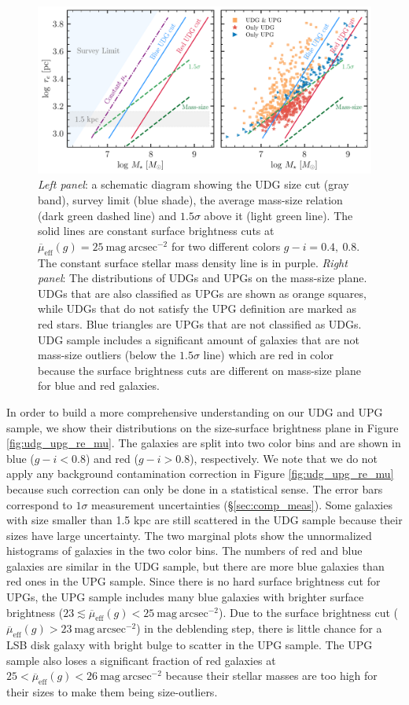 \documentclass[twocolumn,astrosymb,twocolappendix]{aastex631}
\newcommand{\sbunit}{\mathrm{mag\ arcsec}^{-2}}
\newcommand{\sbeff}{\overline{\mu}_{\mathrm{eff}}(g)}
\begin{document}
\begin{CJK*}{UTF8}{gbsn}
\begin{figure}
	\vbox{ 
		\centering
		\includegraphics[width=1\linewidth]{mass_size_plane_new.pdf}
	}
    \caption{\textit{Left panel}: a schematic diagram showing the UDG size cut (gray band), survey limit (blue shade), the average mass-size relation (dark green dashed line) and $1.5\sigma$ above it (light green line). The solid lines are constant surface brightness cuts at $\sbeff=25\ \sbunit$ for two different colors $g-i=0.4,\ 0.8$. The constant surface stellar mass density line is in purple. \textit{Right panel}: The distributions of UDGs and UPGs on the mass-size plane. UDGs that are also classified as UPGs are shown as orange squares, while UDGs that do not satisfy the UPG definition are marked as red stars. Blue triangles are UPGs that are not classified as UDGs. UDG sample includes a significant amount of galaxies that are not mass-size outliers (below the $1.5\sigma$ line) which are red in color because the surface brightness cuts are different on mass-size plane for blue and red galaxies.
    }
    \label{fig:mass_size}
\end{figure}

In order to build a more comprehensive understanding on our UDG and UPG sample, we show their distributions on the size-surface brightness plane in Figure \ref{fig:udg_upg_re_mu}. The galaxies are split into two color bins and are shown in blue ($g-i < 0.8$) and red ($g-i > 0.8$), respectively. We note that we do not apply any background contamination correction in Figure \ref{fig:udg_upg_re_mu} because such correction can only be done in a statistical sense. The error bars correspond to $1\sigma$ measurement uncertainties (\S\ref{sec:comp_meas}). Some galaxies with size smaller than 1.5 kpc are still scattered in the UDG sample because their sizes have large uncertainty. The two marginal plots show the unnormalized histograms of galaxies in the two color bins. The numbers of red and blue galaxies are similar in the UDG sample, but there are more blue galaxies than red ones in the UPG sample. Since there is no hard surface brightness cut for UPGs, the UPG sample includes many blue galaxies with brighter surface brightness ($23 \lesssim \sbeff < 25\ \sbunit$). Due to the surface brightness cut ($\sbeff > 23\ \sbunit$) in the deblending step, there is little chance for a LSB disk galaxy with bright bulge to scatter in the UPG sample. The UPG sample also loses a significant fraction of red galaxies at $25 < \sbeff < 26\ \sbunit$ because their stellar masses are too high for their sizes to make them being size-outliers. 



\end{CJK*}
\end{document}
